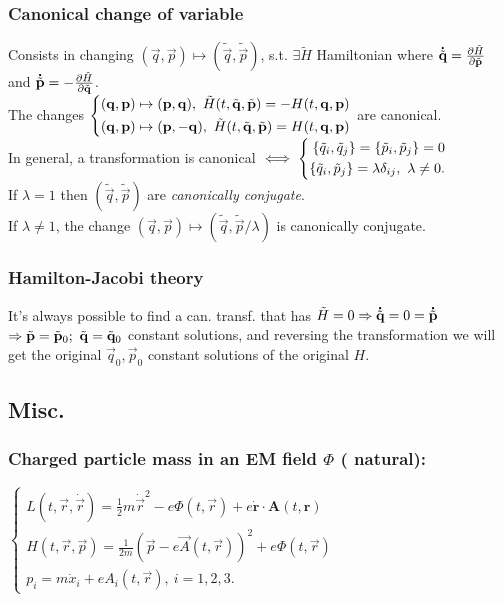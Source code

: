 \subsubsection*{Canonical change of variable}
Consists in changing $(\vec{q},\vec{p})\mapsto(\tilde{\vec{q}},\tilde{\vec{p}})$, s.t. $\exists \tilde{H}$ Hamiltonian where $\accentset{\mbox{\bfseries .}}{\tilde{\mathbf{q}}}=\pdv{\tilde{H}}{\tilde{\mathbf{p}}}$ and $\accentset{\mbox{\bfseries .}}{\tilde{\mathbf{p}}}=-\pdv{\tilde{H}}{\tilde{\mathbf{q}}}$.\\
The changes $
\left\{
\begin{aligned}
(\vec{q},\vec{p})\mapsto(\vec{p},\vec{q}),\ \tilde{H}(t,\tilde{\vec{q}},\tilde{\vec{p}})=-H\tqp\\
(\vec{q},\vec{p})\mapsto(\vec{p},-\vec{q}),\ \tilde{H}(t,\tilde{\vec{q}},\tilde{\vec{p}})=H\tqp
\end{aligned}
\right.
$ are canonical.\\
In general, a transformation is canonical $\iff 
\left\{
\begin{aligned}
\acomm{\tilde{q}_{i}}{\tilde{q}_{j}}=\acomm{\tilde{p}_{i}}{\tilde{p}_{j}}=0\\
\acomm{\tilde{q}_{i}}{\tilde{p}_{j}}=\lambda\delta_{ij},\ \lambda\neq0.
\end{aligned}
\right.
$\\
If $\lambda=1$ then $(\tilde{\vec{q}},\tilde{\vec{p}})$ are \emph{canonically conjugate}. \\
If $\lambda\neq1$, the change $(\vec{q},\vec{p})\mapsto(\tilde{\vec{q}},\tilde{\vec{p}}/\lambda)$ is canonically conjugate.
\subsubsection*{Hamilton-Jacobi theory} It's always possible to find a can. transf. that has $\tilde{H}=0\Rightarrow \accentset{\mbox{\bfseries .}}{\tilde{\mathbf{q}}}=0=\accentset{\mbox{\bfseries .}}{\tilde{\mathbf{p}}}$\\
$\then \tilde{\vec{p}}=\tilde{\vec{p}}_{0};\ \tilde{\vec{q}}=\tilde{\vec{q}}_{0}$ constant solutions, and reversing the transformation we will get the original $\vec{q}_{0},\vec{p}_{0}$ constant solutions of the original $H$.



\subsection{Misc.}
\subsubsection*{Charged particle mass in an EM field $\Phi$ ( natural):}
$
\left\{
\begin{aligned}
L(t,\vec{r},\dot{\vec{r}})=\frac{1}{2}m\dot{\vec{r}}^2-e\Phi(t,\vec{r})+e\dot{\textbf{r}}\cdot \textbf{A}(t,\textbf{r})\\
H(t,\vec{r},\vec{p})=\frac{1}{2m}(\vec{p}-e\vec{A}(t,\vec{r}))^2+e\Phi(t,\vec{r})\\p_i=m\dot{x}_i+eA_i(t,\vec{r}),\ i=1,2,3.
\end{aligned}
\right.
$



